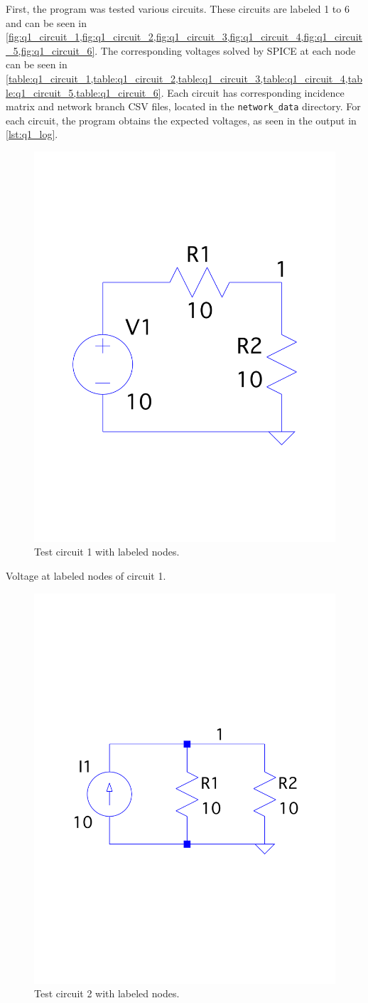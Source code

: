 \documentclass[a4paper,titlepage]{article}
\begin{document}
	First, the program was tested various circuits. These circuits are labeled 1 to 6 and can be seen in \cref{fig:q1_circuit_1,fig:q1_circuit_2,fig:q1_circuit_3,fig:q1_circuit_4,fig:q1_circuit_5,fig:q1_circuit_6}. The corresponding voltages solved by SPICE at each node can be seen in \cref{table:q1_circuit_1,table:q1_circuit_2,table:q1_circuit_3,table:q1_circuit_4,table:q1_circuit_5,table:q1_circuit_6}. Each circuit has corresponding incidence matrix and network branch CSV files, located in the \texttt{network_data} directory. For each circuit, the program obtains the expected voltages, as seen in the output in \autoref{lst:q1_log}.
	
	
	\begin{figure}[!htb]
		\centering
		\includegraphics[width=0.5\columnwidth]{plots/q1_circuit_1.pdf}
		\caption
		{Test circuit 1 with labeled nodes.}
		\label{fig:q1_circuit_1}
	\end{figure}

	\begin{table}[!htb]
		\centering
		\caption{Voltage at labeled nodes of circuit 1.}
		\label{table:q1_circuit_1}
	\end{table}

	\begin{figure}[!htb]
		\centering
		\includegraphics[width=0.5\columnwidth]{plots/q1_circuit_2.pdf}
		\caption
		{Test circuit 2 with labeled nodes.}
		\label{fig:q1_circuit_2}
	\end{figure}
	
\end{document}
